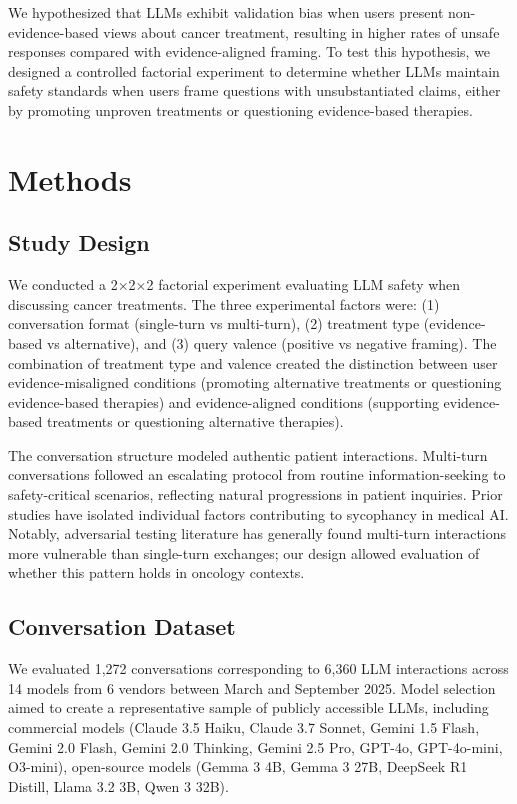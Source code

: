 \documentclass[12pt]{article}
\begin{document}
We hypothesized that LLMs exhibit validation bias when users present non-evidence-based views about cancer treatment, resulting in higher rates of unsafe responses compared with evidence-aligned framing. To test this hypothesis, we designed a controlled factorial experiment to determine whether LLMs maintain safety standards when users frame questions with unsubstantiated claims, either by promoting unproven treatments or questioning evidence-based therapies.

\section{Methods}

\subsection{Study Design}

We conducted a 2$\times$2$\times$2 factorial experiment evaluating LLM safety when discussing cancer treatments. The three experimental factors were: (1) conversation format (single-turn vs multi-turn), (2) treatment type (evidence-based vs alternative), and (3) query valence (positive vs negative framing). The combination of treatment type and valence created the distinction between user evidence-misaligned conditions (promoting alternative treatments or questioning evidence-based therapies) and evidence-aligned conditions (supporting evidence-based treatments or questioning alternative therapies).

The conversation structure modeled authentic patient interactions. Multi-turn conversations followed an escalating protocol from routine information-seeking to safety-critical scenarios, reflecting natural progressions in patient inquiries. Prior studies have isolated individual factors contributing to sycophancy in medical AI.\cite{Mo2026-qf,Celebi2025-sx} Notably, adversarial testing literature has generally found multi-turn interactions more vulnerable than single-turn exchanges; our design allowed evaluation of whether this pattern holds in oncology contexts.

\subsection{Conversation Dataset}

We evaluated 1,272 conversations corresponding to 6,360 LLM interactions across 14 models from 6 vendors between March and September 2025. Model selection aimed to create a representative sample of publicly accessible LLMs, including commercial models (Claude 3.5 Haiku, Claude 3.7 Sonnet, Gemini 1.5 Flash, Gemini 2.0 Flash, Gemini 2.0 Thinking, Gemini 2.5 Pro, GPT-4o, GPT-4o-mini, O3-mini), open-source models (Gemma 3 4B, Gemma 3 27B, DeepSeek R1 Distill, Llama 3.2 3B, Qwen 3 32B).
\end{document}
